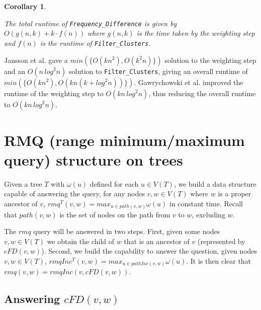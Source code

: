\documentclass{article}
\newcommand{\weight}{\omega}
\newtheorem{freqdiffruntimecomponents}[incompatibility]{Corollary}
\begin{document}
    \begin{freqdiffruntimecomponents}
        \label{cor:freqdiffruntimecomponents}

        The total runtime of \texttt{Frequency\_Difference} is given by $O(g(n, k) + k \cdot f(n))$ where $g(n, k)$ is the time taken by the weighting step and $f(n)$ is the runtime of \texttt{Filter\_Clusters}.
    \end{freqdiffruntimecomponents}

    Jansson et al. \cite{jansson2018algorithms} gave a $min(\{O(kn^2), O(k^2n)\})$ solution to the weighting step and an $O(n\,log^2n)$ solution to \texttt{Filter\_Clusters}, giving an overall runtime of $min(\{O(kn^2), O(kn(k + log^2n))\})$. Gawrychowski et al. \cite{gawrychowski2017faster} improved the runtime of the weighting step to $O(kn\,log^2n)$, thus reducing the overall runtime to $O(kn\,log^2n)$.

    \section{RMQ (range minimum/maximum query) structure on trees}
    \label{sec:rmqstructure}

    Given a tree $T$ with $\weight(u)$ defined for each $u \in V(T)$, we build a data structure capable of answering the query, for any nodes $v, w \in V(T)$ where $w$ is a proper ancestor of $v$, $rmq^T(v, w) = max_{u \in path(v, w)}\weight(u)$ in constant time. Recall that $path(v, w)$ is the set of nodes on the path from $v$ to $w$, excluding $w$.

    The $rmq$ query will be answered in two steps. First, given some nodes $v, w \in V(T)$ we obtain the child of $w$ that is an ancestor of $v$ (represented by $cFD(v, w)$). Second, we build the capability to answer the question, given nodes $v, w \in V(T)$, $rmqInc^T(v, w) = max_{u \in pathInc(v, w)}\weight(u)$. It is then clear that $rmq(v, w) = rmqInc(v, cFD(v, w))$.

    \subsection{Answering $cFD(v, w)$}
\end{document}
